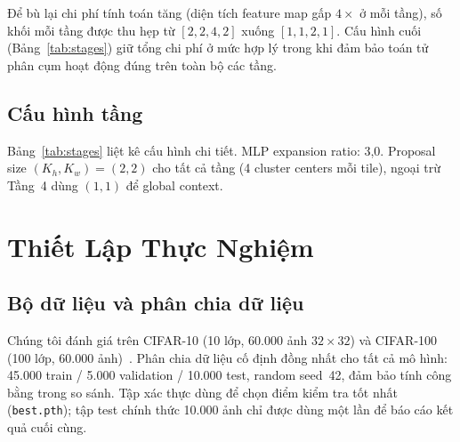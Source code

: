 \documentclass[journal]{IEEEtran}
\begin{document}
Để bù lại chi phí tính toán tăng (diện tích feature map gấp $4\times$
ở mỗi tầng), số khối mỗi tầng được thu hẹp từ $[2,2,4,2]$ xuống
$[1,1,2,1]$. Cấu hình cuối (Bảng~\ref{tab:stages}) giữ tổng chi phí
ở mức hợp lý trong khi đảm bảo toán tử phân cụm hoạt động đúng trên
toàn bộ các tầng.

\subsection{Cấu hình tầng}

Bảng~\ref{tab:stages} liệt kê cấu hình chi tiết. MLP expansion ratio:
3,0. Proposal size $(K_h,K_w){=}(2,2)$ cho tất cả tầng (4 cluster
centers mỗi tile), ngoại trừ Tầng~4 dùng $(1,1)$ để global context.

\begin{table}[!t]
  \caption{Cấu hình tầng của HBCC-Small (S) và HBCC-Medium (M).
           $d$: số block; $C$: embed dim; $\rho$: local ratio.}
  \label{tab:stages}
  \centering
  \renewcommand{\arraystretch}{1.15}
\end{table}

\section{Thiết Lập Thực Nghiệm}
\label{sec:exp}

\subsection{Bộ dữ liệu và phân chia dữ liệu}

Chúng tôi đánh giá trên CIFAR-10 (10 lớp, 60.000 ảnh $32\!\times\!32$)
và CIFAR-100 (100 lớp, 60.000 ảnh)~\cite{Krizhevsky2009Cifar}. Phân
chia dữ liệu cố định đồng nhất cho tất cả mô hình: 45.000 train /
5.000 validation / 10.000 test, random seed~42, đảm bảo tính công
bằng trong so sánh. Tập xác thực dùng để chọn điểm kiểm tra tốt nhất
(\texttt{best.pth}); tập test chính thức 10.000 ảnh chỉ được dùng
một lần để báo cáo kết quả cuối cùng.
\end{document}
